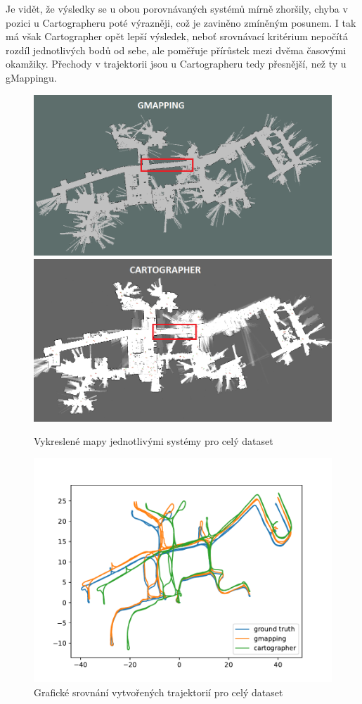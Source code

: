 \documentclass[12pt]{report}
\begin{document}
Je vidět, že výsledky se u obou porovnávaných systémů mírně zhoršily, chyba v pozici u Cartographeru poté výrazněji, což je zaviněno zmíněným posunem. I tak má však Cartographer opět lepší výsledek, neboť srovnávací kritérium nepočítá rozdíl jednotlivých bodů od sebe, ale poměřuje přírůstek mezi dvěma časovými okamžiky. Přechody v trajektorii jsou u Cartographeru tedy přesnější, než ty u gMappingu. 
\newpage
\begin{figure}[!ht]
	\begin{center}
		\includegraphics[width=0.6\columnwidth]{imgs/Maps/Bag/mit_stata/gmapping_mit_stata.png}
		\includegraphics[width=0.6\columnwidth]{imgs/Maps/Bag/mit_stata/cartographer_mit_stata.png}
	\end{center}
	\caption{Vykreslené mapy jednotlivými systémy pro celý dataset}
	\label{fig:mapy_mit_full}
\end{figure}

\begin{figure}[!ht]
	\begin{center}
		\includegraphics[width=0.7\columnwidth]{imgs/mit_full.pdf}
	\end{center}
	\caption{Grafické srovnání vytvořených trajektorií pro celý dataset}
	\label{fig:mit_full}
\end{figure}
\end{document}
